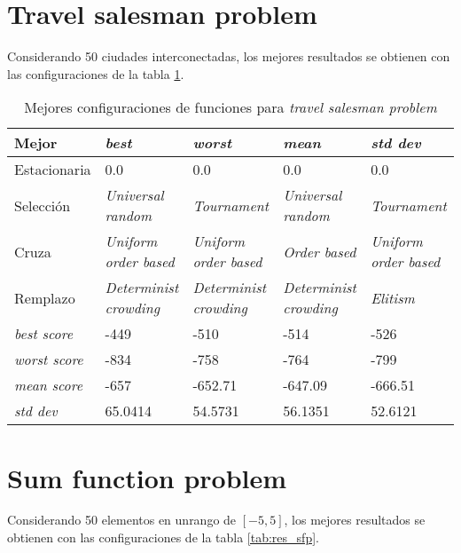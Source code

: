 \section{Travel salesman problem}

Considerando 50 ciudades interconectadas,  los mejores resultados se obtienen con las configuraciones de la tabla \ref{tab:res_tsp}.

\begin{table}[h!]
	\centering
	\begin{tabular}{|p{}|p{}|p{}|p{}|p{}|}
		\hline
		\textbf{Mejor} & \textbf{\textit{best}} & \textbf{\textit{worst}} & \textbf{\textit{mean}} & \textbf{\textit{std dev}}  \\ \hline
		Estacionaria & 0.0 & 0.0 & 0.0 & 0.0 \\
		Selección & \textit{Universal random} &\textit{Tournament}  & \textit{Universal random}  & \textit{Tournament}\\
		Cruza & \textit{Uniform order based}&  \textit{Uniform order based} &  \textit{Order based} & \textit{Uniform order based} \\
		Remplazo & \textit{Determinist crowding} &  \textit{Determinist crowding} &  \textit{Determinist crowding}  & \textit{Elitism} \\ \hline
		\textit{best score}& -449 & -510 & -514 &  -526\\
		\textit{worst score}& -834 & -758 & -764 & -799 \\
		\textit{mean score}& -657 & -652.71 & -647.09 & -666.51 \\
		\textit{std dev}& 65.0414 & 54.5731 & 56.1351 & 52.6121 \\ \hline
	\end{tabular}
	\caption{Mejores configuraciones de funciones para \textit{travel salesman problem}}
	\label{tab:res_tsp}
\end{table}

\section{Sum function problem}

Considerando 50 elementos en unrango de $[-5,5]$, los mejores resultados se obtienen con las configuraciones de la tabla \ref{tab:res_sfp}.


